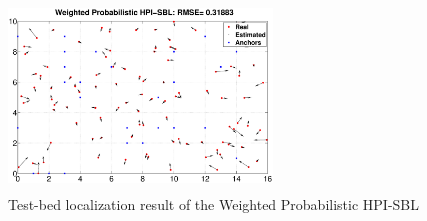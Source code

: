   \begin{figure}[htb]
                  \centering
			    \vspace{-2mm}
            \includegraphics[height=5.0cm,width=7.0cm]{image/testbed.eps}
            \caption{Test-bed localization result of the Weighted Probabilistic HPI-SBL }
             \vspace{-5mm}
             \label{fig7}
        \end{figure}

		
		

